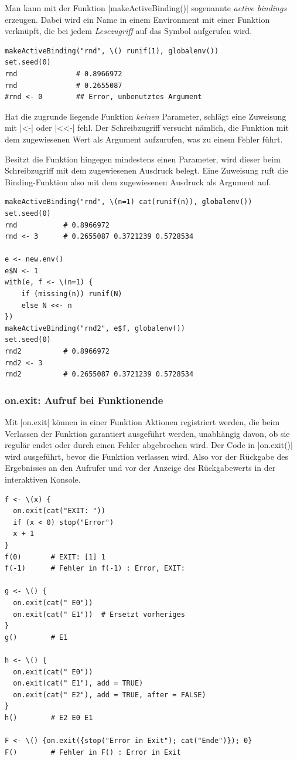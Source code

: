 \documentclass[10pt,twocolumn]{scrartcl}
\renewcommand{\lstinline}{\mycoloredinline}
\begin{document}
Man kann mit der Funktion \lstinline|makeActiveBinding()| sogenannte \emph{active bindings} erzeugen. Dabei wird ein Name in einem Environment mit einer Funktion verknüpft, die bei jedem \emph{Lesezugriff} auf das Symbol aufgerufen wird.

\begin{lstlisting}
makeActiveBinding("rnd", \() runif(1), globalenv())
set.seed(0)
rnd              # 0.8966972
rnd              # 0.2655087
#rnd <- 0        ## Error, unbenutztes Argument
\end{lstlisting}

Hat die zugrunde liegende Funktion \emph{keinen} Parameter, schlägt eine Zuweisung mit \lstinline|<-| oder \lstinline|<<-| fehl.
Der Schreibzugriff versucht nämlich, die Funktion mit dem zugewiesenen Wert als Argument aufzurufen, was zu einem Fehler führt.

Besitzt die Funktion hingegen mindestens einen Parameter, wird dieser beim Schreibzugriff mit dem zugewiesenen Ausdruck belegt. Eine Zuweisung ruft die Binding-Funktion also mit dem zugewiesenen Ausdruck als Argument auf.

\begin{lstlisting}
makeActiveBinding("rnd", \(n=1) cat(runif(n)), globalenv())
set.seed(0)
rnd           # 0.8966972
rnd <- 3      # 0.2655087 0.3721239 0.5728534

e <- new.env()
e$N <- 1
with(e, f <- \(n=1) {
    if (missing(n)) runif(N)
    else N <<- n
})
makeActiveBinding("rnd2", e$f, globalenv())
set.seed(0)
rnd2          # 0.8966972
rnd2 <- 3
rnd2          # 0.2655087 0.3721239 0.5728534
\end{lstlisting}


\subsubsection{on.exit: Aufruf bei Funktionende}

Mit \lstinline|on.exit| können in einer Funktion Aktionen registriert
werden, die beim Verlassen der Funktion garantiert ausgeführt werden,
unabhängig davon, ob sie regulär endet oder durch einen Fehler
abgebrochen wird. Der Code in \lstinline|on.exit()| wird ausgeführt,
bevor die Funktion verlassen wird. Also vor der Rückgabe des
Ergebnisses an den Aufrufer und vor der Anzeige des Rückgabewerts in
der interaktiven Konsole.

\begin{lstlisting}
f <- \(x) {
  on.exit(cat("EXIT: "))
  if (x < 0) stop("Error")
  x + 1
}
f(0)       # EXIT: [1] 1
f(-1)      # Fehler in f(-1) : Error, EXIT:

g <- \() {
  on.exit(cat(" E0"))
  on.exit(cat(" E1"))  # Ersetzt vorheriges
}
g()        # E1

h <- \() {
  on.exit(cat(" E0"))
  on.exit(cat(" E1"), add = TRUE)
  on.exit(cat(" E2"), add = TRUE, after = FALSE)
}
h()        # E2 E0 E1

F <- \() {on.exit({stop("Error in Exit"); cat("Ende")}); 0}
F()        # Fehler in F() : Error in Exit
\end{lstlisting}
\end{document}
